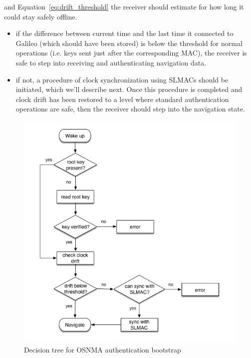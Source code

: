 \begin{itemize}
    and Equation~\ref{eq:drift_threshold} the receiver should estimate for how
    long it could stay safely offline.
    \begin{itemize}
      \item if the difference between current time and the last time it
        connected to Galileo (which should have been stored) is below the
        threshold for normal operations (i.e. keys sent just after the
        corresponding MAC), the receiver is safe to step into receiving and
        authenticating navigation data.
      \item if not, a procedure of clock synchronization using SLMACs should be
        initiated, which we'll describe next. Once this procedure is completed
        and clock drift has been restored to a level where standard
        authentication operations are safe, then the receiver should step into
        the navigation state.
    \end{itemize}
\end{itemize}

\begin{figure}[h!]
  \includegraphics[width=\linewidth]{figures/flowchart_bootstrap.png}
  \caption{Decision tree for OSNMA authentication bootstrap}
  \label{fig:flowchart_boostrap}
\end{figure}

